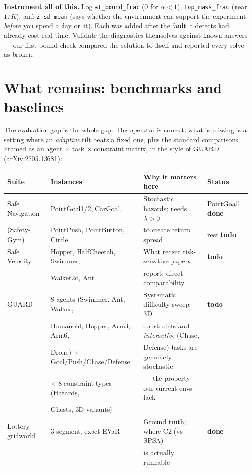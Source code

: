 \documentclass[10pt,a4paper]{article}
\newcommand{\yes}{\textcolor{ok}{\textbf{done}}}
\newcommand{\todo}{\textcolor{open}{\textbf{todo}}}
\begin{document}
\textbf{Instrument all of this.} Log \texttt{at\_bound\_frac} ($0$ for $\alpha<1$),
\texttt{top\_mass\_frac} (near $1/K$), and \texttt{z\_sd\_mean} (says whether the
environment can support the experiment \emph{before} you spend a day on it). Each
was added after the fault it detects had already cost real time. Validate the
diagnostics themselves against known answers --- our first bound-check compared the
solution to itself and reported every solve as broken.

\section{What remains: benchmarks and baselines}

The evaluation gap is the whole gap. The operator is correct; what is missing is a
setting where an \emph{adaptive} tilt beats a fixed one, plus the standard
comparisons. Framed as an agent $\times$ task $\times$ constraint matrix, in the
style of GUARD (arXiv:2305.13681):

\begin{center}
\small
\begin{tabular}{@{}llll@{}}
\toprule
\textbf{Suite} & \textbf{Instances} & \textbf{Why it matters here} & \textbf{Status} \\
\midrule
Safe Navigation & PointGoal1/2, CarGoal, & Stochastic hazards; needs
  $\lambda>0$ & PointGoal1 \yes \\
(Safety-Gym) & PointPush, PointButton, Circle & to create return spread & rest \todo \\[0.3em]
Safe Velocity & Hopper, HalfCheetah, Swimmer, & What recent risk-sensitive
  papers & \todo \\
& Walker2d, Ant & report; direct comparability & \\[0.3em]
GUARD & 8 agents (Swimmer, Ant, Walker, & Systematic difficulty sweep;
  3D & \todo \\
& Humanoid, Hopper, Arm3, Arm6, & constraints and \emph{interactive}
  (Chase, & \\
& Drone) $\times$ Goal/Push/Chase/Defense & Defense) tasks are genuinely
  stochastic & \\
& $\times$ 8 constraint types (Hazards, & --- the property our current envs
  lack & \\
& Ghosts, 3D variants) & & \\[0.3em]
Lottery gridworld & 3-segment, exact EVaR & Ground truth; where C2 (vs SPSA)
  & \yes \\
& & is actually runnable & \\
\bottomrule
\end{tabular}
\end{center}
\end{document}
